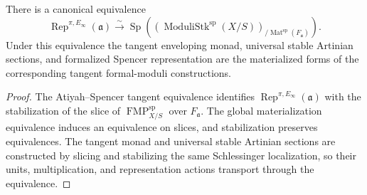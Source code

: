\begin{theorem}
\label{thm:bnli-representation-lie-three}
There is a canonical equivalence
\[
\boxed{
    \operatorname{Rep}^{\pi,E_\infty}(\mathfrak a)
    \xrightarrow{\sim}
    \operatorname{Sp}
    \left(
      \left(\operatorname{ModuliStk}^{\mathrm{sp}}(X/S)\right)_{/
      \operatorname{Mat}^{\mathrm{sp}}(F_{\mathfrak a})}
    \right).}
\]
Under this equivalence the tangent enveloping monad, universal stable Artinian
sections, and formalized Spencer representation are the materialized forms of
the corresponding tangent formal-moduli constructions.
\end{theorem}

\begin{proof}
The Atiyah--Spencer tangent equivalence identifies
$\operatorname{Rep}^{\pi,E_\infty}(\mathfrak a)$ with the stabilization of the
slice of $\operatorname{FMP}^{\mathrm{sp}}_{X/S}$ over $F_{\mathfrak a}$.
The global materialization equivalence induces an equivalence on slices, and
stabilization preserves equivalences.  The tangent monad and universal stable
Artinian sections are constructed by slicing and stabilizing the same
Schlessinger localization, so their units, multiplication, and representation
actions transport through the equivalence.
\end{proof}


